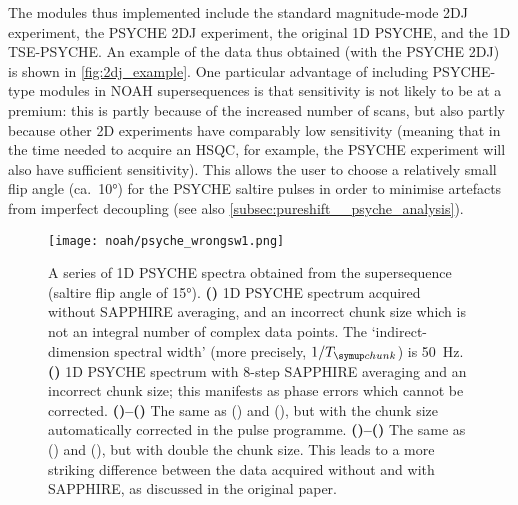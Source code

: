 The modules thus implemented include the standard magnitude-mode 2DJ experiment, the PSYCHE 2DJ experiment\autocite{Foroozandeh2015CC}, the original 1D PSYCHE\autocite{Foroozandeh2014ACIE}, and the 1D TSE-PSYCHE\autocite{Foroozandeh2015CC}.
An example of the data thus obtained (with the PSYCHE 2DJ) is shown in \cref{fig:2dj_example}.
One particular advantage of including PSYCHE-type modules in NOAH supersequences is that sensitivity is not likely to be at a premium: this is partly because of the increased number of scans, but also partly because other 2D experiments have comparably low sensitivity (meaning that in the time needed to acquire an HSQC, for example, the PSYCHE experiment will also have sufficient sensitivity).
This allows the user to choose a relatively small flip angle (ca.\ \ang{10}) for the PSYCHE saltire pulses in order to minimise artefacts from imperfect decoupling (see also \cref{subsec:pureshift__psyche_analysis}).

\begin{figure}[!ht]
    \centering
    \texttt{[image: noah/psyche\_wrongsw1.png]}%
    {\label{fig:psyche_wrongsw1_bad_nosap}}%
    {\label{fig:psyche_wrongsw1_bad_sap}}%
    {\label{fig:psyche_wrongsw1_good_nosap}}%
    {\label{fig:psyche_wrongsw1_good_sap}}%
    {\label{fig:psyche_wrongsw1_good_nosap_25}}%
    {\label{fig:psyche_wrongsw1_good_sap_25}}%
    \caption[Effect of automatic chunk size calculation and SAPPHIRE averaging on NOAH PSYCHE spectra]{
        A series of 1D PSYCHE spectra obtained from the  supersequence (saltire flip angle of \ang{15}).
        \textbf{()} 1D PSYCHE spectrum acquired without SAPPHIRE averaging, and an incorrect chunk size which is not an integral number of complex data points. The `indirect-dimension spectral width' (more precisely, $1/\Tchunk$) is \qty{50}{\Hz}.
        \textbf{()} 1D PSYCHE spectrum with  8-step SAPPHIRE averaging and an incorrect chunk size; this manifests as phase errors which cannot be corrected.
        \textbf{()--()} The same as () and (), but with the chunk size automatically corrected in the pulse programme.
        \textbf{()--()} The same as () and (), but with double the chunk size.
        This leads to a more striking difference between the data acquired without and with SAPPHIRE, as discussed in the original paper\autocite{Moutzouri2017CC}.
    }
    \label{fig:psyche_wrongsw1}
\end{figure}

